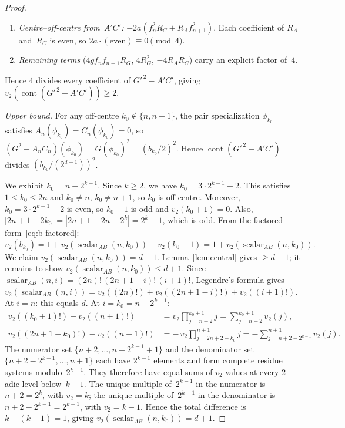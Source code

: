 \documentclass[10pt]{amsart}
\theoremstyle{definition}
\theoremstyle{remark}
\DeclareMathOperator{\cont}{cont}
\begin{document}
\begin{proof}
\begin{enumerate}[label=(\roman*)]
\item \emph{Centre--off-centre from~$A'C'$:}
  $-2a(f_n^2 R_C + R_A f_{n+1}^2)$.
  Each coefficient of $R_A$ and~$R_C$ is even, so
  $2a\cdot(\text{even}) \equiv 0\pmod{4}$.

\item \emph{Remaining terms}
  ($4gf_nf_{n+1}R_G$, $4R_G^2$, $-4R_AR_C$)
  carry an explicit factor of~$4$.
\end{enumerate}
Hence $4$ divides every coefficient of $G'^{\,2}-A'C'$, giving
$v_2(\cont(G'^{\,2}-A'C'))\ge 2$.

\smallskip\noindent\emph{Upper bound.}
For any off-centre $k_0\notin\{n,n+1\}$, the pair specialization
$\phi_{k_0}$ satisfies $A_n(\phi_{k_0})=C_n(\phi_{k_0})=0$, so
$(G^2-A_nC_n)(\phi_{k_0}) = G(\phi_{k_0})^2 = (b_{k_0}/2)^2$.
Hence $\cont(G'^{\,2}-A'C')$ divides $(b_{k_0}/(2^{d+1}))^2$.

We exhibit $k_0 = n + 2^{k-1}$.  Since $k \ge 2$, we have
$k_0 = 3\cdot 2^{k-1} - 2$.  This satisfies $1 \le k_0 \le 2n$
and $k_0 \ne n$, $k_0 \ne n{+}1$, so $k_0$ is off-centre.
Moreover, $k_0 = 3\cdot 2^{k-1} - 2$ is even, so $k_0 + 1$ is odd
and $v_2(k_0{+}1) = 0$.  Also, $|2n{+}1{-}2k_0| = |2n+1-2n-2^k|
= 2^k - 1$, which is odd.  From the factored form~\eqref{eq:b-factored}:
\[
v_2(b_{k_0}) = 1 + v_2(\operatorname{scalar}_{AB}(n,k_0)) - v_2(k_0{+}1)
             = 1 + v_2(\operatorname{scalar}_{AB}(n,k_0)).
\]
We claim $v_2(\operatorname{scalar}_{AB}(n,k_0)) = d + 1$.
Lemma~\ref{lem:central} gives $\ge d+1$; it remains to show
$v_2(\operatorname{scalar}_{AB}(n,k_0)) \le d + 1$.
Since $\operatorname{scalar}_{AB}(n,i) = (2n)!\,(2n{+}1{-}i)!\,(i{+}1)!$,
Legendre's formula gives
$v_2(\operatorname{scalar}_{AB}(n,i))
 = v_2((2n)!) + v_2((2n{+}1{-}i)!) + v_2((i{+}1)!)$.
At $i = n$: this equals $d$.  At $i = k_0 = n + 2^{k-1}$:
\begin{align*}
v_2((k_0{+}1)!) - v_2((n{+}1)!)
  &= v_2\!\prod_{j=n+2}^{k_0+1} j
  = \sum_{j=n+2}^{k_0+1} v_2(j), \\
v_2((2n{+}1{-}k_0)!) - v_2((n{+}1)!)
  &= -\,v_2\!\prod_{j=2n+2-k_0}^{n+1} j
  = -\sum_{j=n+2-2^{k-1}}^{n+1} v_2(j).
\end{align*}
The numerator set $\{n{+}2,\ldots,n{+}2^{k-1}{+}1\}$ and the
denominator set $\{n{+}2{-}2^{k-1},\ldots,n{+}1\}$ each have
$2^{k-1}$ elements and form complete residue systems modulo~$2^{k-1}$.
They therefore have equal sums of $v_2$-values at every
$2$-adic level below~$k{-}1$.  The unique multiple of~$2^{k-1}$
in the numerator is $n{+}2 = 2^k$, with $v_2 = k$;
the unique multiple of~$2^{k-1}$ in the denominator is
$n{+}2{-}2^{k-1} = 2^{k-1}$, with $v_2 = k{-}1$.
Hence the total difference is $k - (k{-}1) = 1$, giving
$v_2(\operatorname{scalar}_{AB}(n,k_0)) = d + 1$.


\end{proof}
\end{document}
